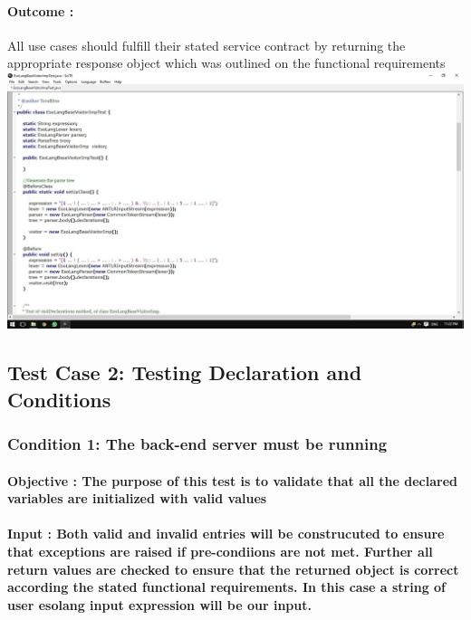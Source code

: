 \documentclass[english]{article}
\begin{document}
			\paragraph{Outcome :}All use cases should fulfill their stated service contract by returning the appropriate response object  which was outlined on the functional requirements\\
		
			\includegraphics[width=\linewidth]{test1.jpg}
			\\[12pt]
			 
			
			\subsection{Test Case 2: Testing Declaration and Conditions}
			\subsubsection{Condition 1: The back-end server must be running }
			\paragraph{Objective : The purpose of this test is to validate that all the declared variables are initialized with valid values}
			\paragraph{Input : Both valid and invalid entries will be construcuted to ensure that exceptions are raised if pre-condiions are not met. Further all return values are checked to ensure that the returned object is correct according the stated
			functional requirements. In this case a string of user  esolang input expression will be our input.}
\end{document}

